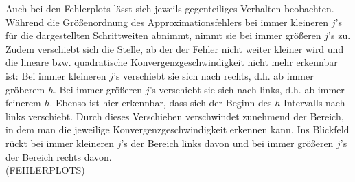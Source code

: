 \documentclass{scrartcl}
\begin{document}
Auch bei den Fehlerplots lässt sich jeweils gegenteiliges Verhalten beobachten. Während die Größenordnung des Approximationsfehlers bei immer kleineren $j$'s für die dargestellten Schrittweiten abnimmt, nimmt sie bei immer größeren $j$'s zu. Zudem verschiebt sich die Stelle, ab der der Fehler nicht weiter kleiner wird und die lineare bzw. quadratische Konvergenzgeschwindigkeit nicht mehr erkennbar ist: Bei immer kleineren $j$'s verschiebt sie sich nach rechts, d.h. ab immer gröberem $h$. Bei immer größeren $j$'s verschiebt sie sich nach links, d.h. ab immer feinerem $h$. Ebenso ist hier erkennbar, dass sich der Beginn des $h$-Intervalls nach links verschiebt. Durch dieses Verschieben verschwindet zunehmend der Bereich, in dem man die jeweilige Konvergenzgeschwindigkeit erkennen kann. Ins Blickfeld rückt bei immer kleineren $j$'s der Bereich links davon und bei immer größeren $j$'s der Bereich rechts davon. \\
(FEHLERPLOTS) \\
\end{document}
